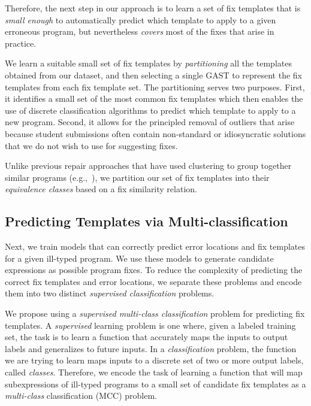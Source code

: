 Therefore, the next step in our approach is to learn a set of fix templates
that is \emph{small enough} to automatically predict which template to apply to
a given erroneous program, but nevertheless \emph{covers} most of the fixes that
arise in practice.

 We learn a suitable small set of fix
templates by \emph{partitioning} all the templates obtained from our dataset,
and then selecting a single GAST to represent the fix templates from each fix
template set.
%
The partitioning serves two purposes.
%
First, it identifies a small set of the most common fix templates which then
enables the use of discrete classification algorithms to predict which template
to apply to a new program.
%
Second, it allows for the principled removal of outliers that arise because
student submissions often contain non-standard or idiosyncratic solutions that
we do not wish to use for suggesting fixes.

Unlike previous repair approaches that have used clustering to group together
similar programs (e.g.,~\citep{Wang_2018, Gulwani_2018}), we partition our set of
fix templates into their \emph{equivalence classes} based on a fix similarity
relation.


\subsection{Predicting Templates via Multi-classification}
\label{sec:overview:predict}

Next, we train models that can correctly predict error locations and fix
templates for a given ill-typed program. We use these models to generate
candidate expressions as possible program fixes. To reduce the
complexity of predicting the correct fix templates and error locations, we
separate these problems and encode them into two distinct \emph{supervised
classification} problems.

We propose using a \emph{supervised multi-class classification} problem for
predicting fix templates. A \emph{supervised} learning problem is one where,
given a labeled training set, the task is to learn a function that accurately
maps the inputs to output labels and generalizes to future inputs. In a
\emph{classification} problem, the function we are trying to learn maps inputs
to a discrete set of two or more output labels, called \emph{classes}.
Therefore, we encode the task of learning a function that will map
subexpressions of ill-typed programs to a small set of candidate fix templates
as a \emph{multi-class} classification (MCC) problem.

